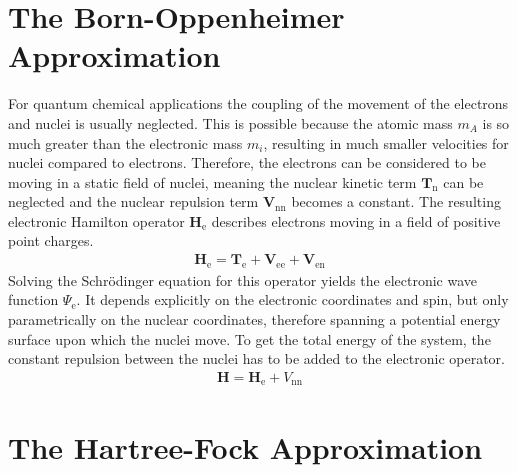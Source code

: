 \section{The Born-Oppenheimer Approximation}
\label{sec:bornoppenheimerapproximation}

For quantum chemical applications the coupling of the movement of the electrons
and nuclei is usually neglected. This is possible because the atomic mass $m_A$
is so much greater than the electronic mass $m_i$, resulting in much smaller
velocities for nuclei compared to
electrons.\autocite{Born_ZurQuantentheorieMolekeln_1927} Therefore, the
electrons can be considered to be moving in a static field of nuclei, meaning
the nuclear kinetic term $\mathbf{T}_\text{n}$ can be neglected and the nuclear
repulsion term $\mathbf{V}_\text{nn}$ becomes a constant. The resulting
electronic Hamilton operator $\mathbf{H}_\text{e}$ describes electrons moving
in a field of positive point charges.
%
\begin{align}
    \mathbf{H}_\text{e}=\mathbf{T}_\text{e} + \mathbf{V}_\text{ee} + \mathbf{V}_\text{en}
\end{align}
%
Solving the Schr\"odinger equation for this operator yields the electronic wave
function $\Psi_\text{e}$. It depends explicitly on the electronic coordinates and spin,
but only parametrically on the nuclear coordinates, therefore spanning a
potential energy surface upon which the nuclei move. To get the total energy of
the system, the constant repulsion between the nuclei has to be added to the
electronic operator. 
%
\begin{align}
    \mathbf{H}=\mathbf{H}_\text{e}+V_\text{nn}\label{eqn:hamiltonoperatorfinal}
\end{align}
%
\section{The Hartree-Fock Approximation}
\label{sec:hartreefockapproximation}

